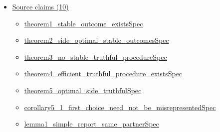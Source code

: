 \documentclass[10pt]{article}
\begin{document}
\begin{itemize}[leftmargin=1.2em]
\begin{itemize}[leftmargin=1.2em]
\item \hyperlink{paper-prerequisite-44aa864d4a515095}{Roth82\allowbreak{}Stable\allowbreak{}Matching.\allowbreak{}Paper\allowbreak{}Interface.\allowbreak{}source\allowbreak{}Men\allowbreak{}Optimal}
\item \hyperlink{paper-prerequisite-38b3f3ba417296e2}{Roth82\allowbreak{}Stable\allowbreak{}Matching.\allowbreak{}Paper\allowbreak{}Interface.\allowbreak{}source\allowbreak{}Stable\allowbreak{}Matching\allowbreak{}Procedure}
\item \hyperlink{paper-prerequisite-6c23e95d9facee8d}{Roth82\allowbreak{}Stable\allowbreak{}Matching.\allowbreak{}Paper\allowbreak{}Interface.\allowbreak{}source\allowbreak{}Women\allowbreak{}Optimal}
\item \hyperlink{paper-prerequisite-a52c1e717dd94cee}{Roth82\allowbreak{}Stable\allowbreak{}Matching.\allowbreak{}Paper\allowbreak{}Interface.\allowbreak{}truthful\allowbreak{}For\allowbreak{}All\allowbreak{}Agents}
\end{itemize}
\item \hyperlink{source-section-f10b5f68e4acf3dc}{Source claims (10)}
\begin{itemize}[leftmargin=1.2em]
\item \hyperlink{source-claim-28dc2b89f44923a5}{theorem1\_\allowbreak{}stable\_\allowbreak{}outcome\_\allowbreak{}exists\allowbreak{}Spec}
\item \hyperlink{source-claim-e0f372cfa20685ca}{theorem2\_\allowbreak{}side\_\allowbreak{}optimal\_\allowbreak{}stable\_\allowbreak{}outcomes\allowbreak{}Spec}
\item \hyperlink{source-claim-fd8851b538d7c013}{theorem3\_\allowbreak{}no\_\allowbreak{}stable\_\allowbreak{}truthful\_\allowbreak{}procedure\allowbreak{}Spec}
\item \hyperlink{source-claim-3a4281641c18a9e6}{theorem4\_\allowbreak{}efficient\_\allowbreak{}truthful\_\allowbreak{}procedure\_\allowbreak{}exists\allowbreak{}Spec}
\item \hyperlink{source-claim-20d2db0d61f9b81c}{theorem5\_\allowbreak{}optimal\_\allowbreak{}side\_\allowbreak{}truthful\allowbreak{}Spec}
\item \hyperlink{source-claim-b35add4c342a0889}{corollary5\_\allowbreak{}1\_\allowbreak{}first\_\allowbreak{}choice\_\allowbreak{}need\_\allowbreak{}not\_\allowbreak{}be\_\allowbreak{}misrepresented\allowbreak{}Spec}
\item \hyperlink{source-claim-f2c197ac0692ce06}{lemma1\_\allowbreak{}simple\_\allowbreak{}report\_\allowbreak{}same\_\allowbreak{}partner\allowbreak{}Spec}

\end{itemize}
\end{itemize}
\end{document}
